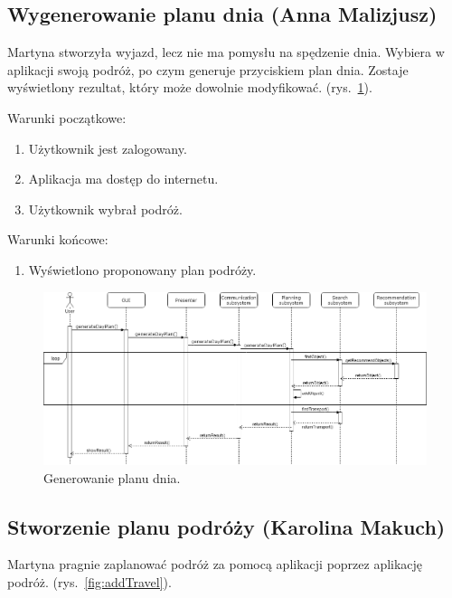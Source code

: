 \documentclass[10pt,twoside,a4paper]{report}
\begin{document}
\subsection{Wygenerowanie planu dnia (Anna Malizjusz)}
\par Martyna stworzyła wyjazd, lecz nie ma pomysłu na spędzenie dnia. Wybiera w aplikacji swoją podróż, po czym generuje przyciskiem plan dnia. Zostaje wyświetlony rezultat, który może dowolnie modyfikować. (rys.~\ref{fig:generateDayPlan}).

\noindent Warunki początkowe:
\begin{enumerate}
  \item Użytkownik jest zalogowany.
  \item Aplikacja ma dostęp do internetu.
  \item Użytkownik wybrał podróż.
\end{enumerate}
\par
\noindent\newline
Warunki końcowe:
\begin{enumerate}
  \item Wyświetlono proponowany plan podróży.
\end{enumerate}

\noindent\newline
\begin{figure}[h]
\centering
\includegraphics[width=\linewidth]{generateDayPlan}
\caption{Generowanie planu dnia.}
\label{fig:generateDayPlan}
\end{figure}
\FloatBarrier


\subsection{Stworzenie planu podróży (Karolina Makuch)}
\FloatBarrier
\par Martyna pragnie zaplanować podróż za pomocą aplikacji poprzez aplikację podróż.  (rys.~\ref{fig:addTravel}).
\end{document}
